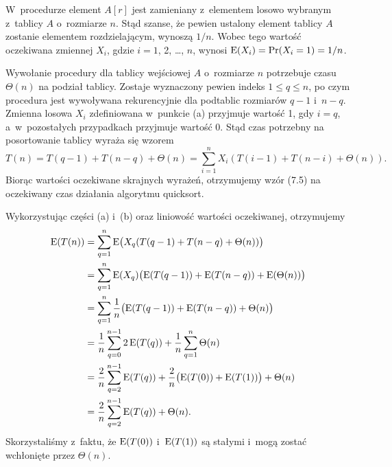 
\subproblem %
W~procedurze  element $A[r]$ jest zamieniany z~elementem losowo wybranym z~tablicy $A$ o~rozmiarze $n$.
Stąd szanse, że pewien ustalony element tablicy $A$ zostanie elementem rozdzielającym, wynoszą $1/n$.
Wobec tego wartość oczekiwana zmiennej $X_i$, gdzie $i=1$, 2, \dots, $n$, wynosi $\operatorname{E}(X_i)=\Pr(X_i=1)=1/n$.

\subproblem %
Wywołanie procedury  dla tablicy wejściowej $A$ o~rozmiarze $n$ potrzebuje czasu $\Theta(n)$ na podział tablicy.
Zostaje wyznaczony pewien indeks $1\le q\le n$, po czym procedura jest wywoływana rekurencyjnie dla podtablic rozmiarów $q-1$ i~$n-q$.
Zmienna losowa $X_i$ zdefiniowana w~punkcie (a) przyjmuje wartość 1, gdy $i=q$, a~w~pozostałych przypadkach przyjmuje wartość 0.
Stąd czas potrzebny na posortowanie  tablicy wyraża się wzorem
\[
	T(n) = T(q-1)+T(n-q)+\Theta(n) = \sum_{i=1}^nX_i(T(i-1)+T(n-i)+\Theta(n)).
\]
Biorąc wartości oczekiwane skrajnych wyrażeń, otrzymujemy wzór (7.5) na oczekiwany czas działania algorytmu quicksort.

\subproblem %

\noindent Wykorzystując części (a) i~(b) oraz liniowość wartości oczekiwanej, otrzymujemy
\begin{align*}
	\operatorname{E}(T(n)) &= \sum_{q=1}^n\operatorname{E}\bigl(X_q(T(q-1)+T(n-q)+\Theta(n))\bigr) \\
	&= \sum_{q=1}^n\operatorname{E}(X_q)\bigl(\operatorname{E}(T(q-1))+\operatorname{E}(T(n-q))+\operatorname{E}(\Theta(n))\bigr) \\
	&= \sum_{q=1}^n\frac{1}{n}\bigl(\operatorname{E}(T(q-1))+\operatorname{E}(T(n-q))+\Theta(n)\bigr) \\
	&= \frac{1}{n}\sum_{q=0}^{n-1}2\operatorname{E}(T(q))+\frac{1}{n}\sum_{q=1}^n\Theta(n) \\
	&= \frac{2}{n}\sum_{q=2}^{n-1}\operatorname{E}(T(q))+\frac{2}{n}\bigl(\operatorname{E}(T(0))+\operatorname{E}(T(1))\bigr)+\Theta(n) \\
	&= \frac{2}{n}\sum_{q=2}^{n-1}\operatorname{E}(T(q))+\Theta(n).
\end{align*}
Skorzystaliśmy z~faktu, że $\operatorname{E}(T(0))$ i~$\operatorname{E}(T(1))$ są stałymi i~mogą zostać wchłonięte przez $\Theta(n)$.


